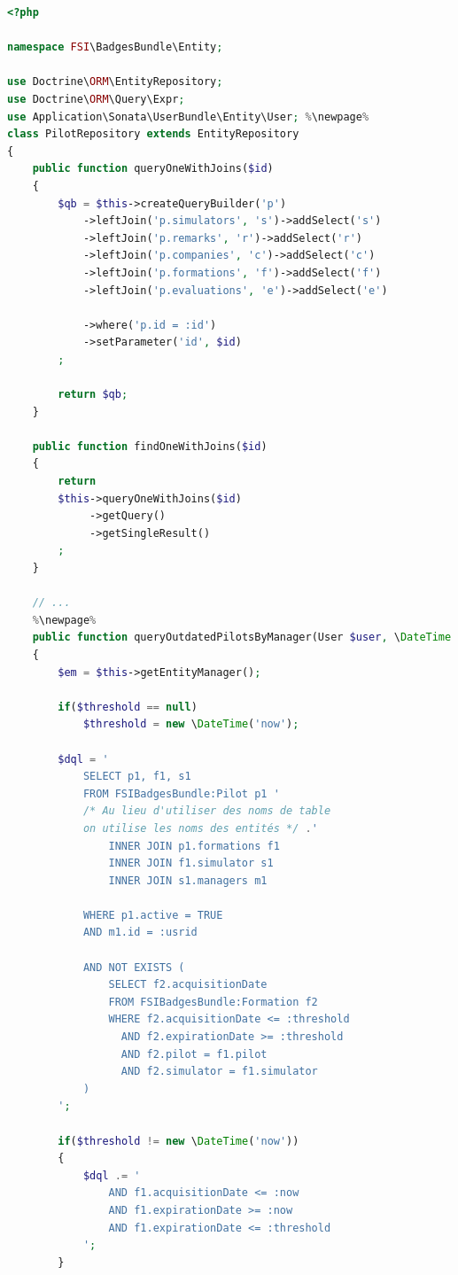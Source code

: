 \documentclass[a4paper,french,11pt,openany,oneside]{memoir}
\begin{document}
\begin{lstlisting}[language=php,escapechar=\%]
<?php
 
namespace FSI\BadgesBundle\Entity;
 
use Doctrine\ORM\EntityRepository;
use Doctrine\ORM\Query\Expr;
use Application\Sonata\UserBundle\Entity\User; %\newpage%
class PilotRepository extends EntityRepository
{
    public function queryOneWithJoins($id)
    {
        $qb = $this->createQueryBuilder('p')
            ->leftJoin('p.simulators', 's')->addSelect('s')
            ->leftJoin('p.remarks', 'r')->addSelect('r')
            ->leftJoin('p.companies', 'c')->addSelect('c')
            ->leftJoin('p.formations', 'f')->addSelect('f')
            ->leftJoin('p.evaluations', 'e')->addSelect('e')
 
            ->where('p.id = :id')
            ->setParameter('id', $id)
        ;
 
        return $qb;
    }
 
    public function findOneWithJoins($id)
    {
        return
        $this->queryOneWithJoins($id)
             ->getQuery()
             ->getSingleResult()
        ;       
    } 
    
    // ...
    %\newpage%
    public function queryOutdatedPilotsByManager(User $user, \DateTime $threshold = null)
    {
        $em = $this->getEntityManager();
 
        if($threshold == null)
            $threshold = new \DateTime('now');

        $dql = '
            SELECT p1, f1, s1
            FROM FSIBadgesBundle:Pilot p1 '
            /* Au lieu d'utiliser des noms de table
            on utilise les noms des entités */ .'
                INNER JOIN p1.formations f1
                INNER JOIN f1.simulator s1
                INNER JOIN s1.managers m1
            
            WHERE p1.active = TRUE
            AND m1.id = :usrid
            
            AND NOT EXISTS (
                SELECT f2.acquisitionDate
                FROM FSIBadgesBundle:Formation f2
                WHERE f2.acquisitionDate <= :threshold
                  AND f2.expirationDate >= :threshold
                  AND f2.pilot = f1.pilot
                  AND f2.simulator = f1.simulator
            )
        ';
 
        if($threshold != new \DateTime('now'))
        {
            $dql .= '
                AND f1.acquisitionDate <= :now
                AND f1.expirationDate >= :now
                AND f1.expirationDate <= :threshold
            ';
        }
 

\end{lstlisting}
\end{document}
